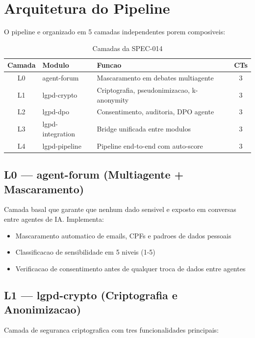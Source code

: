 \documentclass[5p]{elsarticle}
\begin{document}
\section{Arquitetura do Pipeline}
\label{sec:arquitetura}

O pipeline e organizado em 5 camadas independentes porem composiveis:

\begin{table}[H]
\centering
\caption{Camadas da SPEC-014}
\label{tab:camadas}
\begin{tabular}{cllc}
\toprule
Camada & Modulo & Funcao & CTs \\
\midrule
L0 & agent-forum & Mascaramento em debates multiagente & 3 \\
L1 & lgpd-crypto & Criptografia, pseudonimizacao, k-anonymity & 3 \\
L2 & lgpd-dpo & Consentimento, auditoria, DPO agente & 3 \\
L3 & lgpd-integration & Bridge unificada entre modulos & 3 \\
L4 & lgpd-pipeline & Pipeline end-to-end com auto-score & 3 \\
\bottomrule
\end{tabular}
\end{table}

\subsection{L0 --- agent-forum (Multiagente + Mascaramento)}
\label{sec:l0}

Camada basal que garante que nenhum dado sensivel e exposto em conversas entre agentes de IA.
Implementa:
\begin{itemize}
    \item Mascaramento automatico de emails, CPFs e padroes de dados pessoais
    \item Classificacao de sensibilidade em 5 niveis (1-5)
    \item Verificacao de consentimento antes de qualquer troca de dados entre agentes
\end{itemize}

\subsection{L1 --- lgpd-crypto (Criptografia e Anonimizacao)}
\label{sec:l1}

Camada de seguranca criptografica com tres funcionalidades principais:
\end{document}
